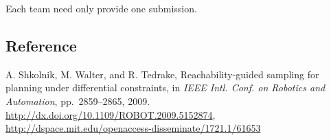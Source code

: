 \documentclass{comp450}
\begin{document}
Each team need only provide one submission.

\subsection*{Reference}
A. Shkolnik, M. Walter, and R. Tedrake, Reachability-guided sampling for planning under differential constraints, in \emph{IEEE Intl. Conf. on Robotics and Automation}, pp.~2859--2865, 2009. \url{http://dx.doi.org/10.1109/ROBOT.2009.5152874}, \url{http://dspace.mit.edu/openaccess-disseminate/1721.1/61653}
\end{document}

